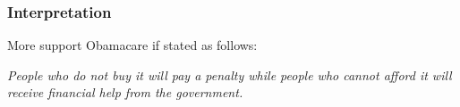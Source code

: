 \documentclass[handout]{beamer}
\newcommand{\blue}[1]{\textcolor{blue2}{#1}}
\newcommand{\phat}{\widehat{p}}
\begin{document}
\begin{frame}[fragile]
\frametitle{Interpretation}

%

\pause More support Obamacare if stated as follows:

\vspace{0.25cm}

\textit{People who do not buy it will pay a penalty \blue{while} people who cannot afford it will receive financial help from the government.}

\end{frame}
\end{document}
